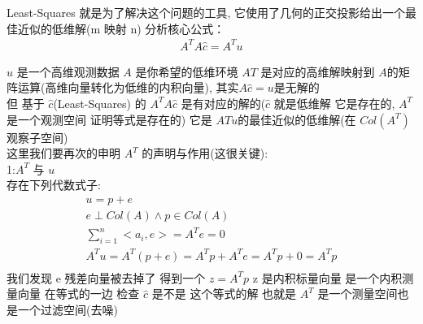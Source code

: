 \documentclass[12pt]{article}
\begin{document}
\begin{flushleft}
    Least-Squares 就是为了解决这个问题的工具, 它使用了几何的正交投影给出一个最佳近似的低维解(m 映射 n)
    分析核心公式： \\
    \begin{align}
        A^{T}A\hat{c} = A^{T}u
    \end{align}

    $u$ 是一个高维观测数据 $A$ 是你希望的低维环境 $A{T}$ 是对应的高维解映射到 $A$的矩阵运算(高维向量转化为低维的内积向量), 其实$A\hat{c}= u$是无解的 \\
    但 基于 $\hat{c}$(Least-Squares) 的 $A^{T}A\hat{c}$ 是有对应的解的($\hat{c}$ 就是低维解 它是存在的, $A^{T}$ 是一个观测空间 证明等式是存在的)
    它是 $A{T}u$的最佳近似的低维解(在 $Col(A^{T})$ 观察子空间) \\

    这里我们要再次的申明 $A^{T}$ 的声明与作用(这很关键): \\
    1:$A^{T}$ 与 $u$ \\
    存在下列代数式子: \\
    \begin{align}
        u = p + e                                                       \\
        e \perp Col(A) \land p \in Col(A)                               \\
        \sum_{i = 1}^{n} <a_{i},e> = A^{T}e= 0                          \\
        A^{T}u = A^{T}(p + e) = A^{T}p + A^{T}e  =  A^{T}p + 0 = A^{T}p \\
    \end{align}
    我们发现 e 残差向量被去掉了 得到一个 $z  = A^{T}p$  z 是内积标量向量 是一个内积测量向量 在等式的一边 检查 $\hat{c}$ 是不是 这个等式的解
    也就是 $A^{T}$ 是一个测量空间也是一个过滤空间(去噪)


\end{flushleft}
\end{document}
